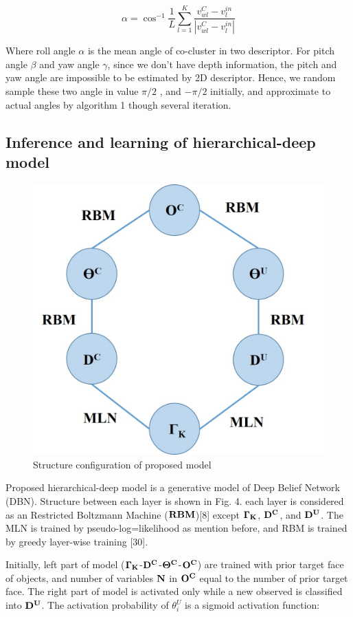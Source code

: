 \documentclass[journal]{IEEEtran}
\begin{document}
\begin{equation}
\alpha =\cos^{-1}\frac{1}{L}\sum_{l=1}^K\frac{v^C_{wl}-v^{in}_l}{|v^C_{wl}-v^{in}_l|}
\end{equation}

Where roll angle $\alpha$ is the mean angle of co-cluster in two descriptor. For  pitch angle $\beta$ and yaw angle $\gamma$, since we don't have depth information, the pitch and yaw angle are impossible to be estimated by 2D descriptor. Hence, we random sample these two angle in value $\pi/2$ , and $-\pi/2$ initially, and approximate to actual angles by algorithm 1 though several iteration.

\subsection{Inference and learning of hierarchical-deep model}

\begin{figure}[!t]
\begin{center}
\includegraphics*[width=2.5 in]{j_img/fig4.jpg}
\caption{Structure configuration of proposed model}\label{test}
\end{center}
\end{figure}

Proposed hierarchical-deep model is a generative model of Deep Belief Network (DBN). Structure between each layer is shown in Fig. 4. each layer is considered as an Restricted Boltzmann Machine ($\bf{RBM}$)[8] except $\bf{\Gamma_K}$, $\bf{D^C}$, and $\bf{D^U}$. The MLN is trained by pseudo-log=likelihood as mention before, and RBM is trained by greedy layer-wise training [30].

Initially, left part of model ($\bf{\Gamma_K}$-$\bf{D^C}$-$\bf{\Theta^C}$-$\bf{O^C}$) are trained with prior target face of objects, and number of variables $\bf{N}$ in $\bf{O^C}$ equal to the number of prior target face. The right part of model is activated only while a new observed is classified into $\bf{D^U}$. The activation probability of $\theta^U_i$ is a sigmoid activation function:
\end{document}
